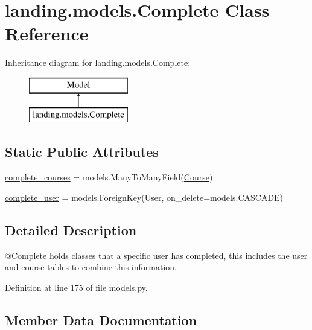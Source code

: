 \hypertarget{classlanding_1_1models_1_1Complete}{}\section{landing.\+models.\+Complete Class Reference}
\label{classlanding_1_1models_1_1Complete}
Inheritance diagram for landing.\+models.\+Complete\+:\begin{figure}[H]
\begin{center}
\leavevmode
\includegraphics[height=2.000000cm]{classlanding_1_1models_1_1Complete}
\end{center}
\end{figure}
\subsection*{Static Public Attributes}
\begin{DoxyCompactItemize}
\item 
\mbox{\hyperlink{classlanding_1_1models_1_1Complete_a6573e7bb17c780113e804dc2978b937d}{complete\+\_\+courses}} = models.\+Many\+To\+Many\+Field(\mbox{\hyperlink{classlanding_1_1models_1_1Course}{Course}})
\item 
\mbox{\hyperlink{classlanding_1_1models_1_1Complete_a991355f0331ce0c2567ee5dd75c24897}{complete\+\_\+user}} = models.\+Foreign\+Key(User, on\+\_\+delete=models.\+C\+A\+S\+C\+A\+DE)
\end{DoxyCompactItemize}


\subsection{Detailed Description}
\begin{DoxyVerb}@Complete  holds classes that a specific user has completed,
        this includes the user and course tables to combine this information.
\end{DoxyVerb}
 

Definition at line 175 of file models.\+py.



\subsection{Member Data Documentation}
\mbox{\label{classlanding_1_1models_1_1Complete_a6573e7bb17c780113e804dc2978b937d}} 
